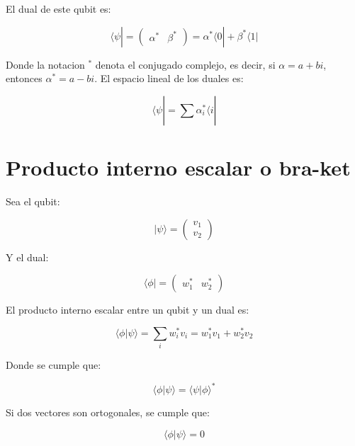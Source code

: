 \documentclass[11pt]{article}
\begin{document}
El dual de este qubit es:

\begin{equation}
    \langle \psi | = \begin{pmatrix} \alpha^* & \beta^* \end{pmatrix} = \alpha^* \langle 0| + \beta^* \langle 1|
\end{equation}

Donde la notacion $^*$ denota el conjugado complejo, es decir, si $\alpha = a + bi$, entonces $\alpha^* = a - bi$. El espacio lineal de los duales es:

\begin{equation}
    \langle \psi | = \sum_{}^{} \alpha_i^* \langle i |
\end{equation}

\section{Producto interno escalar o bra-ket}

Sea el qubit:

\begin{equation}
    |\psi\rangle = \begin{pmatrix} v_1 \\ v_2 \end{pmatrix}
\end{equation}

Y el dual:

\begin{equation}
    \langle \phi | = \begin{pmatrix} w_1^* & w_2^* \end{pmatrix}
\end{equation}

El producto interno escalar entre un qubit y un dual es:

\begin{equation}
    \langle \phi | \psi \rangle = \sum_{i} w_i^* v_i = w_1^* v_1 + w_2^* v_2
\end{equation}

Donde se cumple que:

\begin{equation}
    \langle \phi | \psi \rangle = \langle \psi | \phi \rangle^*
\end{equation}

Si dos vectores son ortogonales, se cumple que:

\begin{equation}
    \langle \phi | \psi \rangle = 0
\end{equation}
\end{document}
